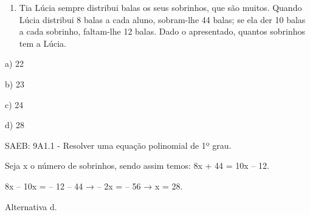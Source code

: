 \begin{escolha}
\begin{boxmedio}
\begin{boxmedio}
{\begin{boxpeq}
\begin{boxpeq}
{\begin{boxpeq}
\begin{boxmedio}
\begin{boxmedio}
\begin{boxpeq}
\begin{boxmedio}
\begin{boxpeq}
\begin{boxpeq}
\begin{boxpeq}
\begin{boxpeq}
\begin{boxmedio}
{\begin{boxmedio}
\begin{boxmedio}
\begin{boxpeq}
\begin{boxmedio}
\begin{boxpeq}
\begin{boxpeq}
\begin{boxpeq}
\begin{escolha}
{\begin{boxmedio}
\begin{boxpeq}
\begin{boxpeq}
\begin{boxpeq}
\begin{boxpeq}
\begin{boxpeq}
\begin{boxmedio}
\begin{boxpeq}
\begin{boxpeq}
\begin{boxpeq}
{\begin{boxpeq}
\begin{boxmedio}
\begin{boxpeq}
\begin{boxpeq}
\begin{boxpeq}
{\begin{boxpeq}
\begin{boxmedio}
{\begin{boxpeq}
\begin{boxpeq}
\begin{boxmedio}
\begin{boxmedio}
\begin{boxpeq}
\begin{boxpeq}
{\begin{boxpeq}
\begin{boxpeq}
\begin{boxpeq}
\begin{boxpeq}
\begin{boxpeq}
\begin{escolha}
\begin{escolha}
{\begin{boxmedio}
\begin{boxpeq}
\begin{q°}
\begin{boxmedio}
\begin{boxpeq}
\begin{boxpeq}
\begin{boxmedio}
\begin{boxmedio}
\begin{boxmedio}
\begin{boxmedio}
{\begin{escolha}
\begin{escolha}
\begin{escolha}
\begin{escolha}
\begin{escolha}
\begin{escolha}
{\begin{enumerate}
\num{\arabic{enumi}.}
\setcounter{enumi}{4}
\tightlist
\item
  Tia Lúcia sempre distribui balas os seus sobrinhos, que são muitos.
  Quando Lúcia distribui 8 balas a cada aluno, sobram-lhe 44 balas; se
  ela der 10 balas a cada sobrinho, faltam-lhe 12 balas. Dado o
  apresentado, quantos sobrinhos tem a Lúcia.
\end{enumerate}

a) 22

b) 23

c) 24

d) 28

SAEB: 9A1.1 - Resolver uma equação polinomial de 1º grau.

Seja x o número de sobrinhos, sendo assim temos: 8x + 44 = 10x -- 12.

8x -- 10x = -- 12 -- 44 → -- 2x = -- 56 → x = 28.

Alternativa d.

}
\end{escolha}
\end{escolha}
\end{escolha}
\end{escolha}
\end{escolha}
\end{escolha}}
\end{boxmedio}
\end{boxmedio}
\end{boxmedio}
\end{boxmedio}
\end{boxpeq}
\end{boxpeq}
\end{boxmedio}
\end{q°}
\end{boxpeq}
\end{boxmedio}}
\end{escolha}
\end{escolha}
\end{boxpeq}
\end{boxpeq}
\end{boxpeq}
\end{boxpeq}
\end{boxpeq}}
\end{boxpeq}
\end{boxpeq}
\end{boxmedio}
\end{boxmedio}
\end{boxpeq}
\end{boxpeq}}
\end{boxmedio}
\end{boxpeq}}
\end{boxpeq}
\end{boxpeq}
\end{boxpeq}
\end{boxmedio}
\end{boxpeq}}
\end{boxpeq}
\end{boxpeq}
\end{boxpeq}
\end{boxmedio}
\end{boxpeq}
\end{boxpeq}
\end{boxpeq}
\end{boxpeq}
\end{boxpeq}
\end{boxmedio}}
\end{escolha}
\end{boxpeq}
\end{boxpeq}
\end{boxpeq}
\end{boxmedio}
\end{boxpeq}
\end{boxmedio}
\end{boxmedio}}
\end{boxmedio}
\end{boxpeq}
\end{boxpeq}
\end{boxpeq}
\end{boxpeq}
\end{boxmedio}
\end{boxpeq}
\end{boxmedio}
\end{boxmedio}
\end{boxpeq}}
\end{boxpeq}
\end{boxpeq}}
\end{boxmedio}
\end{boxmedio}
\end{escolha}
